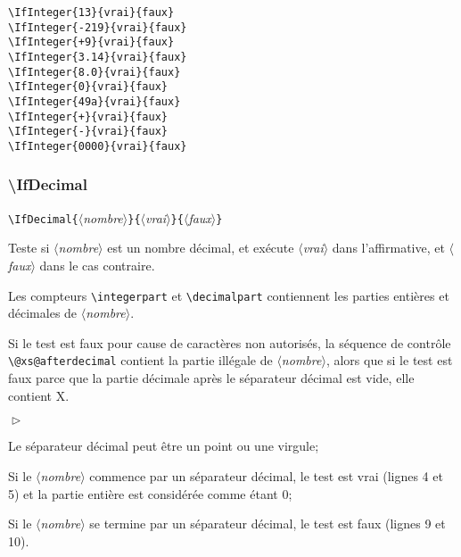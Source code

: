 \documentclass[a4paper,10pt]{article}
\newcommand\guill[1]{\og{}#1\fg{}}
\newcommand\argu[1]{$\langle$\textit{#1}$\rangle$}
\newcommand\ARGU[1]{\texttt{\color{black}\{}\argu{#1}\texttt{\color{black}\}}}
\newenvironment{Conditions}[1][1cm]%
{\begin{list}%
	{$\vartriangleright$}%
	{\setlength{\leftmargin}{#1}
	 \setlength{\itemsep}{0pt}
	 \setlength{\parsep}{0pt}
	 \setlength{\topsep}{2ptplus3ptminus2pt}
	}}%
{\end{list}}
\newcommand\styleexemple{\small\vskip4pt}
\newcommand\verbinline{\lstinline[basicstyle=\normalsize\ttfamily]}
\begin{document}
\begin{minipage}[t]{0.65\linewidth}
\begin{lstlisting}
\IfInteger{13}{vrai}{faux}
\IfInteger{-219}{vrai}{faux}
\IfInteger{+9}{vrai}{faux}
\IfInteger{3.14}{vrai}{faux}
\IfInteger{8.0}{vrai}{faux}
\IfInteger{0}{vrai}{faux}
\IfInteger{49a}{vrai}{faux}
\IfInteger{+}{vrai}{faux}
\IfInteger{-}{vrai}{faux}
\IfInteger{0000}{vrai}{faux}
\end{lstlisting}%
\end{minipage}\hfill
\begin{minipage}[t]{0.35\linewidth}
	\styleexemple
	\par
	\par
	\par
	\par
	\par
	\par
	\par
	\par
	\par
\end{minipage}%

\subsubsection{\ttfamily\textbackslash IfDecimal}
\label{ifdecimal}
\verbinline|\IfDecimal|\ARGU{nombre}\ARGU{vrai}\ARGU{faux}
\smallskip

Teste si \argu{nombre} est un nombre décimal, et exécute \argu{vrai} dans l'affirmative, et \argu{faux} dans le cas contraire.\par\nobreak\smallskip
Les compteurs \verb|\integerpart| et \verb|\decimalpart| contiennent les parties entières et décimales de \argu{nombre}.

Si le test est faux pour cause de caractères non autorisés, la séquence de contrôle \verb|\@xs@afterdecimal| contient la partie illégale de \argu{nombre}, alors que si le test est faux parce que la partie décimale après le séparateur décimal est vide, elle contient \guill{X}.\medskip

\begin{Conditions}
	\item Le séparateur décimal peut être un point ou une virgule;
	\item Si le \argu{nombre} commence par un séparateur décimal, le test est vrai (lignes 4 et 5) et la partie entière est considérée comme étant 0;
	\item Si le \argu{nombre} se termine par un séparateur décimal, le test est faux (lignes 9 et 10).
\end{Conditions}
\end{document}

